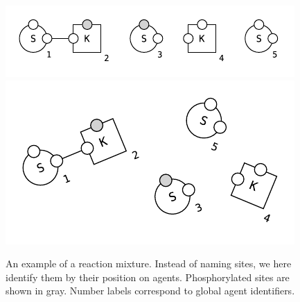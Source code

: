 \begin{figure}[!h]
  \vskip -0.25cm
  \begin{center}
    \ifshort
    \includegraphics[scale=1.0]{figures/mixture-linear.pdf}
    \else
    \includegraphics[scale=0.9]{figures/mixture.pdf}
    \fi
  \end{center}
  \vskip -0.5cm
  \caption{An example of a reaction mixture. Instead of naming sites,
    we here identify them by their position on
    agents.  Phosphorylated sites are shown in gray.  Number
    labels correspond to global agent identifiers. }
  \label{fig:mixture}
\end{figure}

